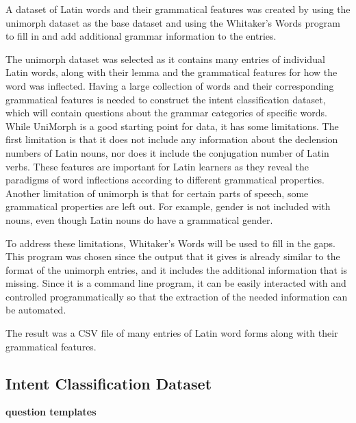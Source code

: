 A dataset of Latin words and their grammatical features
was created by using the \gls{unimorph} dataset as the
base dataset and using the Whitaker's Words program
to fill in and add additional grammar information to the
entries.

The \gls{unimorph} dataset was selected as it contains
many entries of individual Latin words, along with their
lemma and the grammatical features for how the word
was inflected. Having a large collection of words and
their corresponding grammatical features is needed to
construct the intent classification dataset, which will
contain questions about the grammar categories of specific words. While UniMorph is a good starting point
for data, it has some limitations. The first limitation is
that it does not include any information about the declension numbers of Latin nouns, nor does it include the
conjugation number of Latin verbs. These features are
important for Latin learners as they reveal the paradigms
of word inflections according to different grammatical
properties. Another limitation of \gls{unimorph} is that for
certain parts of speech, some grammatical properties
are left out. For example, gender is not included with
nouns, even though Latin nouns do have a grammatical
gender.

To address these limitations, Whitaker's Words will
be used to fill in the gaps. This program was chosen
since the output that it gives is already similar to the
format of the \gls{unimorph} entries, and it includes the
additional information that is missing. Since it is a
command line program, it can be easily interacted with
and controlled programmatically so that the extraction
of the needed information can be automated.

The result was a CSV file of many entries of Latin
word forms along with their grammatical features.

\subsection{Intent Classification Dataset}
\label{sec:intent_classification_dataset}

\textbf{question templates}

